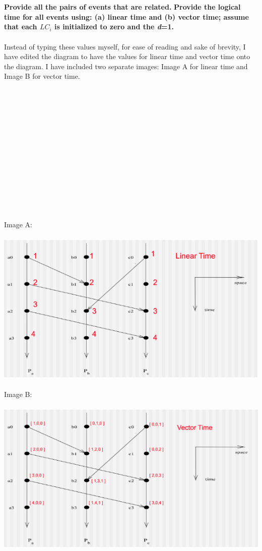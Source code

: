 \documentclass{article}
\begin{document}
\\ \\
\textbf{Provide all the pairs of events that are related.}
\textbf{Provide the logical time for all events using: (a) linear time and (b) vector time; assume that each \textit{$LC_i$} is initialized to zero and the \textit{d}=1.}\\ \\
Instead of typing these values myself, for ease of reading and sake of brevity, I have edited the diagram to have the values for linear time and vector time onto the diagram. I have included two separate images: Image A for linear time and Image B for vector time. \\ \\ \\ \\ \\ \\ \\ \\ \\ \\ \\ \\ \\ \\ \\
Image A: \\ \\ 
\includegraphics[width=\textwidth,height=\textheight,keepaspectratio]{linear.png} \\ \\
Image B: \\ \\
\includegraphics[width=\textwidth,height=\textheight,keepaspectratio]{vector.png}
\end{document}
